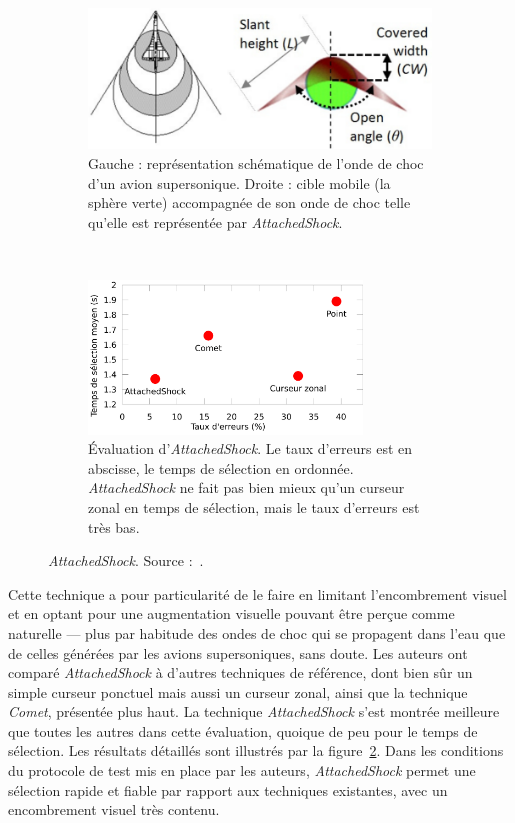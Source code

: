 	\begin{figure}[!htbp]
		\centering
		\begin{subfigure}[t]{0.48\textwidth}
			\centering
			\includegraphics[width=\textwidth]{figures/ch2/asas}
			\caption{Gauche : représentation schématique de l'onde de choc d'un avion supersonique. Droite : cible mobile (la sphère verte) accompagnée de son onde de choc telle qu'elle est représentée par \emph{AttachedShock}.}
			\label{fig:asas}
		\end{subfigure}
		~
		\begin{subfigure}[t]{0.48\textwidth}
			\centering
			\includegraphics[width=0.8\textwidth]{figures/ch2/asRes}
			\caption{Évaluation d'\emph{AttachedShock}. Le taux d'erreurs est en abscisse, le temps de sélection en ordonnée. \emph{AttachedShock} ne fait pas bien mieux qu'un curseur zonal en temps de sélection, mais le taux d'erreurs est très bas.}
			\label{fig:asRes}
		\end{subfigure}
		\caption{\emph{AttachedShock}. Source :~\cite{you2012attachedshock}.}
		\label{fig:asMain}
	\end{figure}
	
	Cette technique a pour particularité de le faire en limitant l'encombrement visuel et en optant pour une augmentation visuelle pouvant être perçue comme \og naturelle \fg{} --- plus par habitude des ondes de choc qui se propagent dans l'eau que de celles générées par les avions supersoniques, sans doute. Les auteurs ont comparé \emph{AttachedShock} à d'autres techniques de référence, dont bien sûr un simple curseur ponctuel mais aussi un curseur zonal, ainsi que la technique \emph{Comet}, présentée plus haut. La technique \emph{AttachedShock} s'est montrée meilleure que toutes les autres dans cette évaluation, quoique de peu pour le temps de sélection. Les résultats détaillés sont illustrés par la figure~\ref{fig:asRes}. Dans les conditions du protocole de test mis en place par les auteurs, \emph{AttachedShock} permet une sélection rapide et fiable par rapport aux techniques existantes, avec un encombrement visuel très contenu.
	
